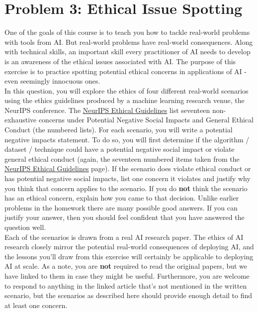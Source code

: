 \documentclass{article}
\theoremstyle{case}
\theoremstyle{definition}
\begin{document}
\newpage
\section*{Problem 3: Ethical Issue Spotting}
One of the goals of this course is to teach you how to tackle real-world problems with tools from AI.  But real-world problems have real-world consequences. Along with technical skills, an important skill every practitioner of AI needs to develop is an awareness of the ethical issues associated with AI. The purpose of this exercise is to practice spotting potential ethical concerns in applications of AI - even seemingly innocuous ones. \\
In this question, you will explore the ethics of four different real-world scenarios using the ethics guidelines produced by a machine learning research venue, the NeurIPS conference. The \underline{\href{https://neurips.cc/public/EthicsGuidelines}{NeurIPS Ethical Guidelines}} list seventeen non-exhaustive concerns under Potential Negative Social Impacts and General Ethical Conduct (the numbered lists). For each scenario, you will write a potential negative impacts statement. To do so, you will first determine if the algorithm / dataset / technique could have a potential negative
social impact or violate general ethical conduct (again, the seventeen numbered items taken from the \underline{\href{https://neurips.cc/public/EthicsGuidelines}{NeurIPS Ethical Guidelines}} page). If the scenario does violate ethical conduct or has potential negative social impacts, list one concern it violates and justify why you think that concern applies to the scenario. If you do \textbf{not} think the scenario has an ethical concern, explain how you came to that decision. 
Unlike earlier problems in the homework there are many possible good answers. If you can justify your answer, then you should feel confident that you have answered the question well. \\
Each of the scenarios is drawn from a real AI research paper. The ethics of AI research closely mirror the potential real-world consequences of deploying AI, and the lessons you’ll draw from this exercise will certainly be applicable to deploying AI at scale. As a note, you are \textbf{not} required to read the original papers, but we have linked to them in case they might be useful. Furthermore, you are welcome to respond to anything in the linked article that's not mentioned in the written scenario, but the scenarios as described here should provide enough detail to find at least one concern.
\end{document}
